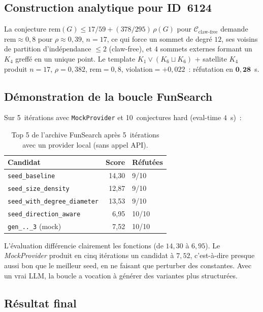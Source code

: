 \documentclass[11pt,a4paper]{article}
\begin{document}
\subsection{Construction analytique pour ID~6124}

La conjecture
$\mathrm{rem}(G) \le 17/59 + (378/295)\,\rho(G)$ pour $\mathcal{C}_{\text{claw-free}}$
demande $\mathrm{rem} \approx 0{,}8$ pour $\rho \approx 0{,}39$, $n = 17$,
ce qui force un sommet de degré $12$, ses voisins de partition d'indépendance
$\le 2$ (claw-free), et $4$ sommets externes formant un $K_4$ greffé en un
unique point. Le template
$K_1 \vee (K_6 \sqcup K_6)$ + satellite $K_4$ produit
$n = 17$, $\rho = 0{,}382$, $\mathrm{rem} = 0{,}8$,
$\text{violation} = +0{,}022$~: réfutation en $\boldsymbol{0{,}28}$~s.

\subsection{Démonstration de la boucle FunSearch}

Sur 5~itérations avec \texttt{MockProvider} et 10~conjectures hard
(eval-time $4$~s)~:

\begin{table}[h]\centering\footnotesize
\begin{tabular}{lrl}
\toprule
Candidat & Score & Réfutées \\
\midrule
\texttt{seed\_baseline}            & 14{,}30 & 9/10 \\
\texttt{seed\_size\_density}       & 12{,}87 & 9/10 \\
\texttt{seed\_with\_degree\_diameter}    & 13{,}53 & 9/10 \\
\texttt{seed\_direction\_aware}    &  6{,}95 & 10/10 \\
\texttt{gen\_..\_3} (mock)         &  7{,}52 & 10/10 \\
\bottomrule
\end{tabular}
\caption{Top 5 de l'archive FunSearch après 5~itérations avec un provider
local (sans appel API).}
\end{table}

L'évaluation différencie clairement les fonctions
(de $14{,}30$ à $6{,}95$). Le \emph{MockProvider} produit en cinq itérations
un candidat à $7{,}52$, c'est-à-dire \og{}presque aussi bon\fg{} que le
meilleur seed, en ne faisant que perturber des constantes. Avec un vrai
LLM, la boucle a vocation à générer des variantes plus structurées.

\subsection{Résultat final}
\end{document}
